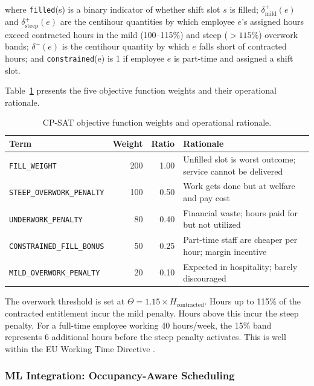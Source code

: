 \documentclass[12pt,a4paper,oneside]{article}
\begin{document}
where \texttt{filled}(s) is a binary indicator of whether shift slot $s$ is filled; $\delta^+_{\text{mild}}(e)$ and $\delta^+_{\text{steep}}(e)$ are the centihour quantities by which employee $e$'s assigned hours exceed contracted hours in the mild (100--115\%) and steep ($>115\%$) overwork bands; $\delta^-(e)$ is the centihour quantity by which $e$ falls short of contracted hours; and \texttt{constrained}(e) is 1 if employee $e$ is part-time and assigned a shift slot.

Table~\ref{tab:weights} presents the five objective function weights and their operational rationale.

\begin{table}[H]
\centering
\label{tab:weights}
\small
\begin{tabular}{@{}lrrl@{}}
\toprule
\textbf{Term} & \textbf{Weight} & \textbf{Ratio} & \textbf{Rationale} \\
\midrule
\texttt{FILL\_WEIGHT}             & 200 & 1.00 & Unfilled slot is worst outcome; service cannot be delivered \\
\texttt{STEEP\_OVERWORK\_PENALTY} & 100 & 0.50 & Work gets done but at welfare and pay cost \\
\texttt{UNDERWORK\_PENALTY}       &  80 & 0.40 & Financial waste; hours paid for but not utilized \\
\texttt{CONSTRAINED\_FILL\_BONUS} &  50 & 0.25 & Part-time staff are cheaper per hour; margin incentive \\
\texttt{MILD\_OVERWORK\_PENALTY}  &  20 & 0.10 & Expected in hospitality; barely discouraged \\
\bottomrule
\end{tabular}
\caption{CP-SAT objective function weights and operational rationale.}
\label{tab:weights}
\end{table}

The overwork threshold is set at $\Theta = 1.15 \times H_{\text{contracted}}$. Hours up to 115\% of the contracted entitlement incur the mild penalty. Hours above this incur the steep penalty. For a full-time employee working 40 hours/week, the 15\% band represents 6 additional hours before the steep penalty activates. This is well within the EU Working Time Directive \citep{wtd2003}.

\subsubsection{ML Integration: Occupancy-Aware Scheduling}
\end{document}
